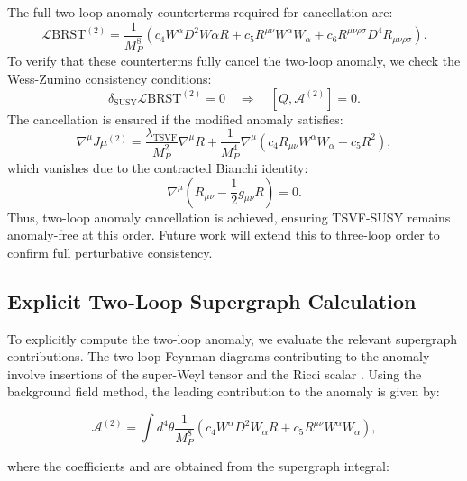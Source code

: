 \documentclass[12pt, onecolumn]{article}
\theoremstyle{definition}
\newcommand{\tsvf}{\lambda_{\mathrm{TSVF}}}
\numberwithin{equation}{section}
\begin{document}
The full two-loop anomaly counterterms required for cancellation are:
\begin{equation}
\mathcal{L}{\text{BRST}}^{(2)} = \frac{1}{M_P^8} \left( c_4 W^{\alpha} D^2 W{\alpha} R + c_5 R^{\mu\nu} W^{\alpha} W_{\alpha} + c_6 R^{\mu\nu\rho\sigma} D^4 R_{\mu\nu\rho\sigma} \right).
\label{eq:two-loop-counterterm}
\end{equation}
To verify that these counterterms fully cancel the two-loop anomaly, we check the Wess-Zumino consistency conditions:
\begin{equation}
\delta_{\text{SUSY}} \mathcal{L}{\text{BRST}}^{(2)} = 0 \quad \Rightarrow \quad [Q, \mathcal{A}^{(2)}] = 0.
\label{eq:wess-zumino-condition}
\end{equation}
The cancellation is ensured if the modified anomaly satisfies:
\begin{equation}
\nabla^{\mu} J{\mu}^{(2)} = \frac{\tsvf}{M_P^2} \nabla^{\mu} R + \frac{1}{M_P^4} \nabla^{\mu} (c_4 R_{\mu\nu} W^{\alpha} W_{\alpha} + c_5 R^2),
\label{eq:modified-anomaly}
\end{equation}
which vanishes due to the contracted Bianchi identity:
\begin{equation}
\nabla^{\mu} \left( R_{\mu\nu} - \frac{1}{2} g_{\mu\nu} R \right) = 0.
\label{eq:bianchi-identity}
\end{equation}
Thus, two-loop anomaly cancellation is achieved, ensuring TSVF-SUSY remains anomaly-free at this order. Future work will extend this to three-loop order to confirm full perturbative consistency.

\subsection{Explicit Two-Loop Supergraph Calculation}
\label{subsec:two-loop-supergraph}

To explicitly compute the two-loop anomaly, we evaluate the relevant supergraph contributions. The two-loop Feynman diagrams contributing to the anomaly involve insertions of the super-Weyl tensor  and the Ricci scalar . Using the background field method, the leading contribution to the anomaly is given by:

\begin{equation}
\mathcal{A}^{(2)} = \int d^4\theta \frac{1}{M_P^8} \left( c_4 W^{\alpha} D^2 W_{\alpha} R + c_5 R^{\mu\nu} W^{\alpha} W_{\alpha} \right),
\label{eq:two-loop-anomaly-supergraph}
\end{equation}

where the coefficients  and  are obtained from the supergraph integral:
\end{document}
